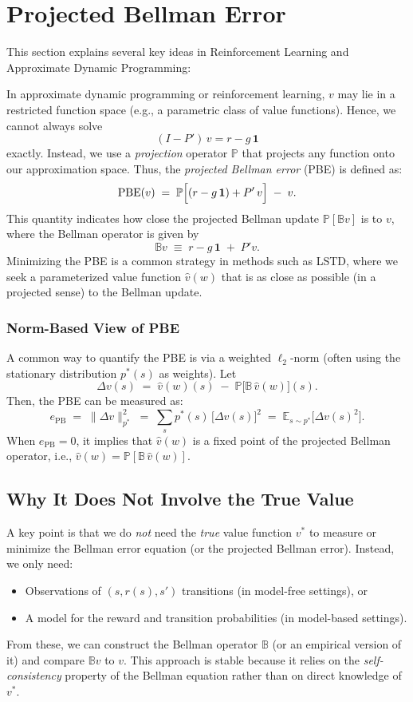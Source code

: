 \section{Projected Bellman Error}
\label{sec:bellman_error}

This section explains several key ideas in Reinforcement Learning and Approximate Dynamic Programming:


In approximate dynamic programming or reinforcement learning, $v$ may lie in a restricted function space (e.g., a parametric class of value functions). Hence, we cannot always solve 
\[
(I - P')\,v = r - g\,\mathbf{1}
\]
exactly. Instead, we use a \emph{projection} operator $\mathbb{P}$ that projects any function onto our approximation space. Thus, the \emph{projected Bellman error} (PBE) is defined as:
\[
\text{PBE}(v) 
\;=\; \mathbb{P}\Bigl[(r - g\,\mathbf{1}) + P'\,v\Bigr] \;-\; v.
\]
This quantity indicates how close the projected Bellman update $\mathbb{P}[\mathbb{B}v]$ is to $v$, where the Bellman operator is given by
\[
\mathbb{B}v \;\equiv\; r - g\,\mathbf{1} \;+\; P'v.
\]
Minimizing the PBE is a common strategy in methods such as LSTD, where we seek a parameterized value function $\hat{v}(w)$ that is as close as possible (in a projected sense) to the Bellman update.

\subsubsection{Norm-Based View of PBE}
A common way to quantify the PBE is via a weighted $\ell_2$-norm (often using the stationary distribution $p^*(s)$ as weights). Let
\[
\Delta v(s) \;=\; \hat{v}(w)(s) \;-\; \mathbb{P}\bigl[\mathbb{B}\,\hat{v}(w)\bigr](s).
\]
Then, the PBE can be measured as:
\[
e_{\mathrm{PB}}
\;=\;
\bigl\lVert \Delta v \bigr\rVert_{p^*}^2
\;=\;
\sum_{s} p^*(s)\,\bigl[\Delta v(s)\bigr]^2
\;=\;
\mathbb{E}_{s \sim p^*}\bigl[\Delta v(s)^2\bigr].
\]
When $e_{\mathrm{PB}} = 0$, it implies that $\hat{v}(w)$ is a fixed point of the projected Bellman operator, i.e., $\hat{v}(w) = \mathbb{P}[\mathbb{B}\,\hat{v}(w)]$.

\subsection{Why It Does Not Involve the True Value}
A key point is that we do \emph{not} need the \emph{true} value function $v^*$ to measure or minimize the Bellman error equation (or the projected Bellman error). Instead, we only need:
\begin{itemize}
    \item Observations of $(s, r(s), s')$ transitions (in model-free settings), or
    \item A model for the reward and transition probabilities (in model-based settings).
\end{itemize}
From these, we can construct the Bellman operator $\mathbb{B}$ (or an empirical version of it) and compare $\mathbb{B}v$ to $v$. This approach is stable because it relies on the \emph{self-consistency} property of the Bellman equation rather than on direct knowledge of $v^*$.

